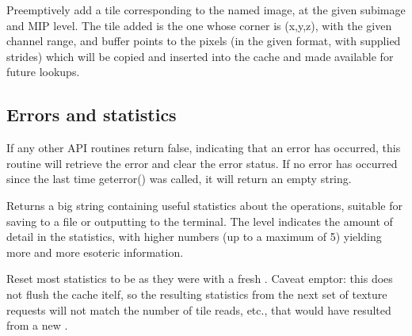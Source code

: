 Preemptively add a tile corresponding to the named image, at the
given subimage and MIP level.  The tile added is the one whose
corner is (x,y,z), with the given channel range,
and buffer points to the pixels (in the given
format, with supplied strides) which will be copied and inserted
into the cache and made available for future lookups.
\apiend

\subsection{Errors and statistics}
\label{sec:imagecache:api:geterror}
\label{sec:imagecache:api:getstats}
\label{sec:imagecache:api:resetstats}

If any other API routines return {\cf false}, indicating that an error
has occurred, this routine will retrieve the error and clear the error
status.  If no error has occurred since the last time {\cf geterror()}
was called, it will return an empty string.
\apiend

Returns a big string containing useful statistics about the \ImageCache
operations, suitable for saving to a file or outputting to the terminal.
The {\cf level} indicates the amount of detail in the statistics,
with higher numbers (up to a maximum of 5) yielding more and more
esoteric information.
\apiend

Reset most statistics to be as they were with a fresh
\ImageCache.  Caveat emptor: this does not flush the cache
itelf, so the resulting statistics from the next set of texture
requests will not match the number of tile reads, etc., that
would have resulted from a new \ImageCache.
\apiend



\chapwidthend
